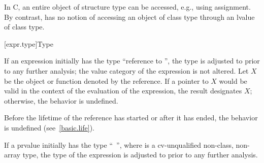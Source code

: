 %
%
%
%
%
\begin{note}
In C, an entire object of structure type can be accessed, e.g., using assignment.
By contrast, \Cpp{} has no notion of accessing an object of class type
through an lvalue of class type.
\end{note}

[expr.type]{Type}

\pnum
{}%
If an expression initially has the type ``reference to
'', the type is adjusted to
 prior to any further analysis;
the value category of the expression is not altered.
Let $X$ be the object or function denoted by the reference.
If a pointer to $X$ would be valid in
the context of the evaluation of the expression,
the result designates $X$;
otherwise, the behavior is undefined.
%
%
%
%
%
\begin{note}
Before the lifetime of the reference has started or after it has ended,
the behavior is undefined (see~\ref{basic.life}).
\end{note}

\pnum
If a prvalue initially has the type ``\cv{}~'', where
 is a cv-unqualified non-class, non-array type, the type of
the expression is adjusted to  prior to any further analysis.

